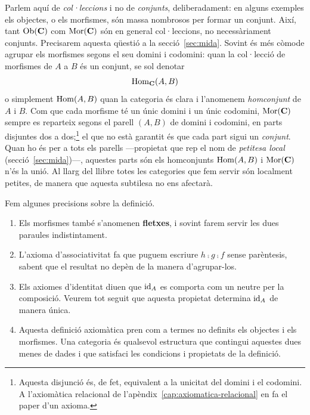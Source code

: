 Parlem aquí de \emph{col·leccions} i no de \emph{conjunts}, deliberadament: en alguns exemples els objectes, o els morfismes, són massa nombrosos per formar un conjunt. Així, tant $\operatorname{Ob}(\mathbf{C})$ com $\operatorname{Mor}(\mathbf{C})$ són en general col·leccions, no necessàriament conjunts. Precisarem aquesta qüestió a la secció~\ref{sec:mida}. Sovint és més còmode agrupar els morfismes segons el seu domini i codomini: quan la col·lecció de morfismes de $A$ a $B$ és un conjunt, se sol denotar
\[
\operatorname{Hom}_{\mathbf{C}}(A,B)
\]
o simplement $\operatorname{Hom}(A,B)$ quan la categoria és clara i l'anomenem \emph{homconjunt} de $A$ i $B$. Com que cada morfisme té un únic domini i un únic codomini, $\operatorname{Mor}(\mathbf{C})$ sempre es reparteix segons el parell $(A,B)$ de domini i codomini, en parts disjuntes dos a dos;\footnote{Aquesta disjunció és, de fet, equivalent a la unicitat del domini i el codomini. A l'axiomàtica relacional de l'apèndix~\ref{cap:axiomatica-relacional} en fa el paper d'un axioma.} el que no està garantit és que cada part sigui un \emph{conjunt}. Quan ho és per a tots els parells ---propietat que rep el nom de \emph{petitesa local} (secció~\ref{sec:mida})---, aquestes parts són els homconjunts $\operatorname{Hom}(A,B)$ i $\operatorname{Mor}(\mathbf{C})$ n'és la unió. Al llarg del llibre totes les categories que fem servir són localment petites, de manera que aquesta subtilesa no ens afectarà.

\begin{observacio}
Fem algunes precisions sobre la definició.
\begin{enumerate}
\item Els morfismes també s'anomenen \textbf{fletxes}, i sovint farem servir les dues paraules indistintament.
\item L'axioma d'associativitat fa que puguem escriure $h\comp g\comp f$ sense parèntesis, sabent que el resultat no depèn de la manera d'agrupar-los.
\item Els axiomes d'identitat diuen que $\operatorname{id}_A$ es comporta com un neutre per la composició. Veurem tot seguit que aquesta propietat determina $\operatorname{id}_A$ de manera única.
\item Aquesta definició axiomàtica pren com a termes no definits els objectes i els morfismes. Una categoria és qualsevol estructura que contingui aquestes dues menes de dades i que satisfaci les condicions i propietats de la definició.\footnotemark
\end{enumerate}
\end{observacio}

